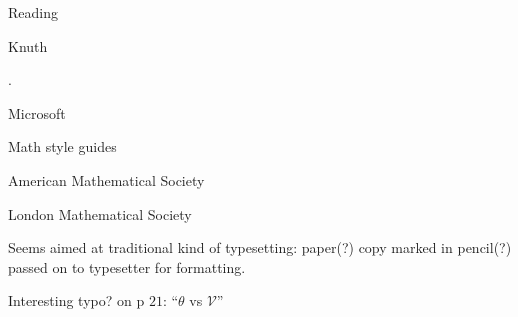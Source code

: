 \documentclass[11pt]{PalisadesLakesBook}
\begin{document}
\begin{plSection}{Reading}
\begin{plSection}{Knuth}









.


\end{plSection}%
\begin{plSection}{Microsoft}


\end{plSection}%
\begin{plSection}{Math style guides}
\begin{plSection}{American Mathematical Society}



\end{plSection}%
\begin{plSection}{London Mathematical Society}


Seems aimed at traditional kind of typesetting:
paper(?) copy marked in pencil(?)  
passed on to typesetter for formatting.

Interesting typo? on p $21$: ``$\theta$ vs $\mathscr{V}$''


\end{plSection}
\end{plSection}
\end{plSection}
\end{document}
